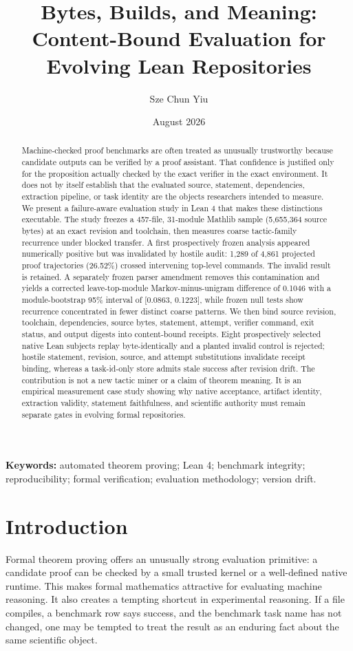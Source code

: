 \documentclass[11pt]{article}
\title{Bytes, Builds, and Meaning: Content-Bound Evaluation for Evolving Lean Repositories}
\author{Sze Chun Yiu}
\date{August 2026}
\begin{document}
\maketitle

\begin{abstract}
Machine-checked proof benchmarks are often treated as unusually trustworthy because candidate outputs can be verified by a proof assistant. That confidence is justified only for the proposition actually checked by the exact verifier in the exact environment. It does not by itself establish that the evaluated source, statement, dependencies, extraction pipeline, or task identity are the objects researchers intended to measure. We present a failure-aware evaluation study in Lean 4 that makes these distinctions executable. The study freezes a 457-file, 31-module Mathlib sample (5,655,364 source bytes) at an exact revision and toolchain, then measures coarse tactic-family recurrence under blocked transfer. A first prospectively frozen analysis appeared numerically positive but was invalidated by hostile audit: 1,289 of 4,861 projected proof trajectories (26.52\%) crossed intervening top-level commands. The invalid result is retained. A separately frozen parser amendment removes this contamination and yields a corrected leave-top-module Markov-minus-unigram difference of 0.1046 with a module-bootstrap 95\% interval of [0.0863, 0.1223], while frozen null tests show recurrence concentrated in fewer distinct coarse patterns. We then bind source revision, toolchain, dependencies, source bytes, statement, attempt, verifier command, exit status, and output digests into content-bound receipts. Eight prospectively selected native Lean subjects replay byte-identically and a planted invalid control is rejected; hostile statement, revision, source, and attempt substitutions invalidate receipt binding, whereas a task-id-only store admits stale success after revision drift. The contribution is not a new tactic miner or a claim of theorem meaning. It is an empirical measurement case study showing why native acceptance, artifact identity, extraction validity, statement faithfulness, and scientific authority must remain separate gates in evolving formal repositories.
\end{abstract}

\noindent\textbf{Keywords:} automated theorem proving; Lean 4; benchmark integrity; reproducibility; formal verification; evaluation methodology; version drift.

\section{Introduction}
Formal theorem proving offers an unusually strong evaluation primitive: a candidate proof can be checked by a small trusted kernel or a well-defined native runtime. This makes formal mathematics attractive for evaluating machine reasoning. It also creates a tempting shortcut in experimental reasoning. If a file compiles, a benchmark row says success, and the benchmark task name has not changed, one may be tempted to treat the result as an enduring fact about the same scientific object.
\end{document}
